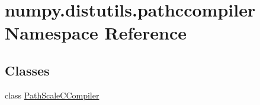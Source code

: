 \hypertarget{namespacenumpy_1_1distutils_1_1pathccompiler}{}\section{numpy.\+distutils.\+pathccompiler Namespace Reference}
\label{namespacenumpy_1_1distutils_1_1pathccompiler}
\subsection*{Classes}
\begin{DoxyCompactItemize}
\item 
class \hyperlink{classnumpy_1_1distutils_1_1pathccompiler_1_1PathScaleCCompiler}{Path\+Scale\+C\+Compiler}
\end{DoxyCompactItemize}
